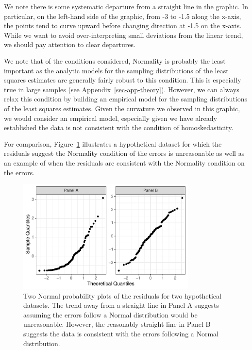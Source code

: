 \documentclass[
  letterpaper,
  DIV=11,
  numbers=noendperiod]{scrreprt}
\theoremstyle{plain}
\theoremstyle{definition}
\theoremstyle{definition}
\theoremstyle{remark}
\begin{document}
We note there is some systematic departure from a straight line in the
graphic. In particular, on the left-hand side of the graphic, from -3 to
-1.5 along the x-axis, the points tend to curve upward before changing
direction at -1.5 on the x-axis. While we want to avoid
over-interpreting small deviations from the linear trend, we should pay
attention to clear departures.

We note that of the conditions considered, Normality is probably the
least important as the analytic models for the sampling distributions of
the least squares estimates are generally fairly robust to this
condition. This is especially true in large samples (see
Appendix~\ref{sec-app-theory}). However, we can always relax this
condition by building an empirical model for the sampling distributions
of the least squares estimates. Given the curvature we observed in this
graphic, we would consider an empirical model, especially given we have
already established the data is not consistent with the condition of
homoskedasticity.

For comparison, Figure~\ref{fig-regassessment-normal-comparison}
illustrates a hypothetical dataset for which the residuals suggest the
Normality condition of the errors is unreasonable as well as an example
of when the residuals are consistent with the Normality condition on the
errors.

\begin{figure}

{\centering \includegraphics[width=0.8\textwidth,height=\textheight]{./images/fig-regassessment-normal-comparison-1.pdf}

}

\caption{\label{fig-regassessment-normal-comparison}Two Normal
probability plots of the residuals for two hypothetical datasets. The
trend away from a straight line in Panel A suggests assuming the errors
follow a Normal distribution would be unreasonable. However, the
reasonably straight line in Panel B suggests the data is consistent with
the errors following a Normal distribution.}

\end{figure}
\end{document}
